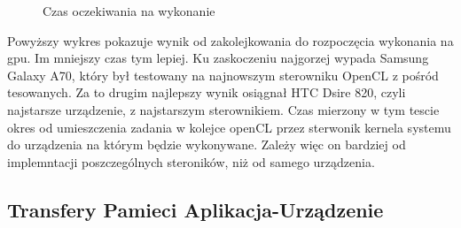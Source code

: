 \begin{figure}[H]
\caption{Czas oczekiwania na wykonanie}
\end{figure}

Powyższy wykres pokazuje wynik od zakolejkowania do rozpoczęcia wykonania na gpu. Im mniejszy czas tym lepiej. Ku zaskoczeniu najgorzej wypada Samsung Galaxy A70, który był testowany na najnowszym sterowniku OpenCL z pośród tesowanych. Za to drugim najlepszy wynik osiągnał HTC Dsire 820, czyli najstarsze urządzenie, z najstarszym sterownikiem. Czas mierzony w tym tescie okres od umieszczenia zadania w kolejce openCL przez sterwonik kernela systemu do urządzenia na którym będzie wykonywane. Zależy więc on bardziej od implemntacji poszczególnych steroników, niż od samego urządzenia.

\subsection[Transfery Pamieci Aplikacja-Urządzenie]{Transfery Pamieci Aplikacja-Urządzenie}

